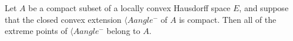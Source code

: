 Let $A$ be a compact subset of a locally convex Hausdorff space $E$, and suppose that the closed convex extension $\langle A 
angle^{-}$ of $A$ is compact. Then all of the extreme points of $\langle A 
angle^{-}$ belong to $A$.
